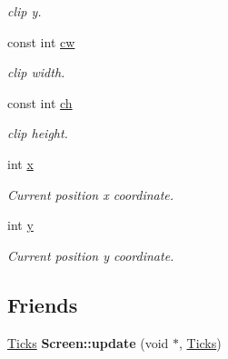 \begin{DoxyCompactItemize}
\begin{DoxyCompactList}\small\item\em clip y. \end{DoxyCompactList}\item 
\hypertarget{classGUI_1_1Drawable_ab985de16e8c5543337da5911bcb554b8}{const int \hyperlink{classGUI_1_1Drawable_ab985de16e8c5543337da5911bcb554b8}{cw}}\label{classGUI_1_1Drawable_ab985de16e8c5543337da5911bcb554b8}

\begin{DoxyCompactList}\small\item\em clip width. \end{DoxyCompactList}\item 
\hypertarget{classGUI_1_1Drawable_a18e1efe0fc94c2a2a86d74d1121e9f72}{const int \hyperlink{classGUI_1_1Drawable_a18e1efe0fc94c2a2a86d74d1121e9f72}{ch}}\label{classGUI_1_1Drawable_a18e1efe0fc94c2a2a86d74d1121e9f72}

\begin{DoxyCompactList}\small\item\em clip height. \end{DoxyCompactList}\item 
\hypertarget{classGUI_1_1Drawable_a098294925bd310aa41080a2441790b80}{int \hyperlink{classGUI_1_1Drawable_a098294925bd310aa41080a2441790b80}{x}}\label{classGUI_1_1Drawable_a098294925bd310aa41080a2441790b80}

\begin{DoxyCompactList}\small\item\em Current position x coordinate. \end{DoxyCompactList}\item 
\hypertarget{classGUI_1_1Drawable_a574c99954cc268937f2c66ebe1332316}{int \hyperlink{classGUI_1_1Drawable_a574c99954cc268937f2c66ebe1332316}{y}}\label{classGUI_1_1Drawable_a574c99954cc268937f2c66ebe1332316}

\begin{DoxyCompactList}\small\item\em Current position y coordinate. \end{DoxyCompactList}\end{DoxyCompactItemize}
\subsection*{Friends}
\begin{DoxyCompactItemize}
\item 
\hypertarget{classGUI_1_1Drawable_a0b4c177802d4d44b64a5d2e72cf8cb9d}{\hyperlink{namespaceGUI_af396fee5d5c26b98218f5803f85e3b65}{Ticks} {\bfseries Screen\-::update} (void $\ast$, \hyperlink{namespaceGUI_af396fee5d5c26b98218f5803f85e3b65}{Ticks})}\label{classGUI_1_1Drawable_a0b4c177802d4d44b64a5d2e72cf8cb9d}

\end{DoxyCompactItemize}


